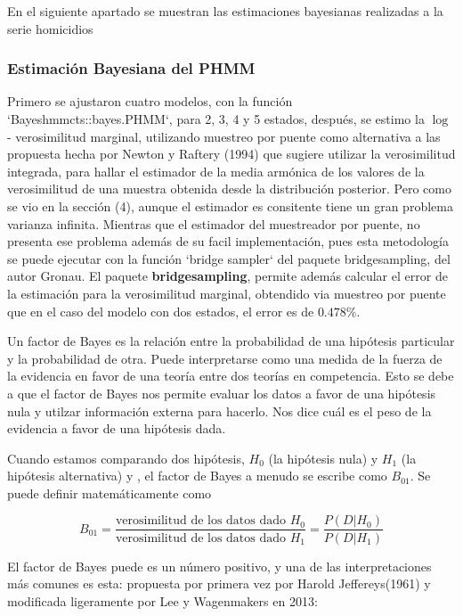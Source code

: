 \documentclass[a4paper]{article}\usepackage[]{graphicx}\usepackage[]{color}
\begin{document}
En el siguiente apartado se muestran las estimaciones bayesianas realizadas a la serie homicidios


\clearpage

\subsubsection*{Estimación Bayesiana del PHMM}





Primero se ajustaron cuatro modelos, con la función `Bayeshmmcts::bayes.PHMM`, para 2, 3, 4 y 5 estados, después, se estimo la $\log$ - verosimilitud marginal, utilizando muestreo por puente como alternativa a las propuesta hecha por Newton y Raftery (1994) que sugiere utilizar la verosimilitud integrada, para hallar el estimador de la media armónica de los valores de la verosimilitud de una muestra obtenida desde la distribución posterior. Pero como se vio en la sección (4), aunque el estimador es consitente tiene un gran problema varianza infinita. Mientras que el estimador del muestreador por puente, no presenta ese problema además de su facil implementación, pues esta metodología se puede ejecutar con la función `bridge sampler` del paquete bridgesampling, del autor Gronau. El paquete \textbf{bridgesampling}, permite además calcular el error de la estimación para la verosimilitud marginal, obtendido via muestreo por puente que en el caso del modelo con dos estados, el error es de $0.478 \%$. 

Un factor de Bayes es la relación entre la probabilidad de una hipótesis particular y la probabilidad de otra. Puede interpretarse como una medida de la fuerza de la evidencia en favor de una teoría entre dos teorías en competencia. Esto se debe a que el factor de Bayes nos permite evaluar los datos a favor de una hipótesis nula y utilzar información externa para hacerlo. Nos dice cuál es el peso de la evidencia a favor de una hipótesis dada.

Cuando estamos comparando dos hipótesis, $H_0$ (la hipótesis nula) y $H_1$ (la hipótesis alternativa) y , el factor de Bayes a menudo se escribe como $B_{01}$. Se puede definir matemáticamente como

$$B_{01} = \frac{\text{verosimilitud de los datos dado $H_0$}}{\text{verosimilitud de los datos dado $H_1$}} = \frac{P(D | H_0)}{P(D | H_1)}$$

El factor de Bayes puede es un número positivo, y una de las interpretaciones más comunes es esta: propuesta por primera vez por Harold Jeffereys(1961) y modificada ligeramente por Lee y Wagenmakers en 2013:
\end{document}
